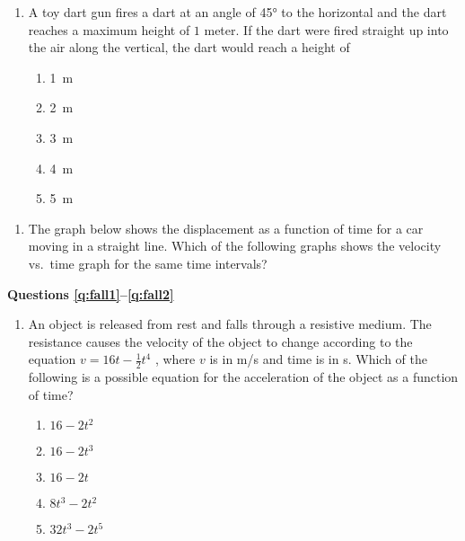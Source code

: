 \documentclass{../../../oss-apphys}
\begin{document}
\begin{multicols}{2}
\begin{enumerate}[resume,leftmargin=18pt]
  \item A toy dart gun fires a dart at an angle of \ang{45} to the horizontal
    and the dart reaches a maximum height of $1$ meter. If the dart were fired
    straight up into the air along the vertical, the dart would reach a height
    of
    \begin{enumerate}[noitemsep,topsep=0pt,leftmargin=18pt,label=(\Alph*)]
    \item\SI{1}{\metre}
    \item\SI{2}{\metre}
    \item\SI{3}{\metre}
    \item\SI{4}{\metre}
    \item\SI{5}{\metre}
    \end{enumerate}
  \end{enumerate}
  \columnbreak
  
  \begin{enumerate}[resume,leftmargin=18pt]
    
  \item The graph below shows the displacement as a function of time for a
    car moving in a straight line. Which of the following graphs shows the
    velocity vs.\ time graph for the same time intervals?
    \begin{center}
    \end{center}
  \end{enumerate}
  \columnbreak
  
  \textbf{Questions \ref{q:fall1}--\ref{q:fall2}}
  
  \begin{enumerate}[resume,leftmargin=18pt]
  \item An object is released from rest and falls through a resistive medium.
    The resistance causes the velocity of the object to change according to the
    equation $v=16t-\frac{1}{2}t^4$ , where $v$ is in \si{m/s} and time is in
    \si{\second}. Which of the following is a possible equation for the
    acceleration of the object as a function of time?
    \begin{enumerate}[noitemsep,topsep=0pt,leftmargin=18pt,label=(\Alph*)]
    \item $16-2t^2$
    \item $16-2t^3$
    \item $16-2t$
    \item $8t^3-2t^2$
    \item $32t^3-2t^5$
    \end{enumerate}
    \label{q:fall1}
    

\end{enumerate}
\end{multicols}
\end{document}
